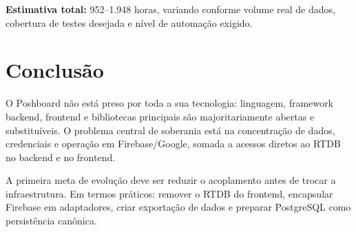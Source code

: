 \documentclass[12pt,a4paper]{article}
\begin{document}
\textbf{Estimativa total:} 952--1.948 horas, variando conforme volume real de dados, cobertura de testes desejada e n{\'i}vel de automa{\c c}{\~a}o exigido.

\section{Conclus{\~a}o}

O Poshboard n{\~a}o est{\'a} preso por toda a sua tecnologia: linguagem, framework backend, frontend e bibliotecas principais s{\~a}o majoritariamente abertas e substitu{\'i}veis. O problema central de soberania est{\'a} na concentra{\c c}{\~a}o de dados, credenciais e opera{\c c}{\~a}o em Firebase/Google, somada a acessos diretos ao RTDB no backend e no frontend.

A primeira meta de evolu{\c c}{\~a}o deve ser reduzir o acoplamento antes de trocar a infraestrutura. Em termos pr{\'a}ticos: remover o RTDB do frontend, encapsular Firebase em adaptadores, criar exporta{\c c}{\~a}o de dados e preparar PostgreSQL como persist{\^e}ncia can{\^o}nica.

\printbibliography
\end{document}
